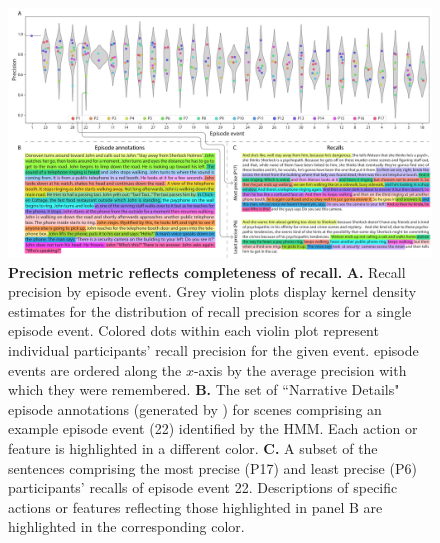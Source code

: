 \documentclass{article}
\begin{document}
\begin{figure}[t]
  \centering
  \includegraphics[width=1\textwidth]{figs/precision_detail}
  \caption{\small \textbf{Precision metric reflects completeness of recall.} \textbf{A.} Recall precision by episode event.  Grey violin plots display kernel density estimates for the distribution of recall precision scores for a single episode event.  Colored dots within each violin plot represent individual participants' recall precision for the given event.  episode events are ordered along the $x$-axis by the average precision with which they were remembered.  \textbf{B.} The set of ``Narrative Details" episode annotations (generated by \citealp{ChenEtal17}) for scenes comprising an example episode event (22) identified by the HMM.  Each action or feature is highlighted in a different color.  \textbf{C.} A subset of the sentences comprising the most precise (P17) and least precise (P6) participants' recalls of episode event 22.  Descriptions of specific actions or features reflecting those highlighted in panel B are highlighted in the corresponding color.}
  \label{fig:precision-detail}
\end{figure}
\end{document}
